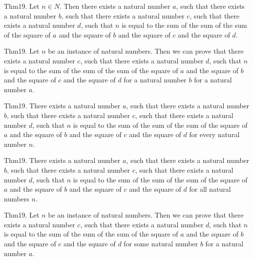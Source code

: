 \documentclass{article}
\begin{document}
Thm19. Let $n \in N$. Then there exists a natural number $a$, such that there exists a natural number $b$, such that there exists a natural number $c$, such that there exists a natural number $d$, such that $n$ is equal to the sum of the sum of the sum of the square of $a$ and the square of $b$ and the square of $c$ and the square of $d$.

Thm19. Let $n$ be an instance of natural numbers. Then we can prove that there exists a natural number $c$, such that there exists a natural number $d$, such that $n$ is equal to the sum of the sum of the sum of the square of $a$ and the square of $b$ and the square of $c$ and the square of $d$ for a natural number $b$ for a natural number $a$.

Thm19. There exists a natural number $a$, such that there exists a natural number $b$, such that there exists a natural number $c$, such that there exists a natural number $d$, such that $n$ is equal to the sum of the sum of the sum of the square of $a$ and the square of $b$ and the square of $c$ and the square of $d$ for every natural number $n$.

Thm19. There exists a natural number $a$, such that there exists a natural number $b$, such that there exists a natural number $c$, such that there exists a natural number $d$, such that $n$ is equal to the sum of the sum of the sum of the square of $a$ and the square of $b$ and the square of $c$ and the square of $d$ for all natural numbers $n$.

Thm19. Let $n$ be an instance of natural numbers. Then we can prove that there exists a natural number $c$, such that there exists a natural number $d$, such that $n$ is equal to the sum of the sum of the sum of the square of $a$ and the square of $b$ and the square of $c$ and the square of $d$ for some natural number $b$ for a natural number $a$.
\end{document}
